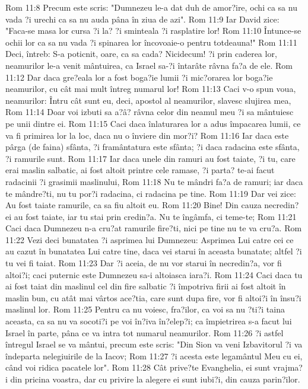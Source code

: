 Rom 11:8  Precum este scris: "Dumnezeu le-a dat duh de amor?ire, ochi ca sa nu vada ?i urechi ca sa nu auda pâna în ziua de azi".
Rom 11:9  Iar David zice: "Faca-se masa lor cursa ?i la? ?i sminteala ?i rasplatire lor!
Rom 11:10  Întunce-se ochii lor ca sa nu vada ?i spinarea lor încovoaie-o pentru totdeauna!"
Rom 11:11  Deci, întreb: S-a poticnit, oare, ca sa cada? Nicidecum! ?i prin caderea lor, neamurilor le-a venit mântuirea, ca Israel sa-?i întarâte râvna fa?a de ele.
Rom 11:12  Dar daca gre?eala lor a fost boga?ie lumii ?i mic?orarea lor boga?ie neamurilor, cu cât mai mult întreg numarul lor!
Rom 11:13  Caci v-o spun voua, neamurilor: Întru cât sunt eu, deci, apostol al neamurilor, slavesc slujirea mea,
Rom 11:14  Doar voi izbuti sa a?â? râvna celor din neamul meu ?i sa mântuiesc pe unii dintre ei.
Rom 11:15  Caci daca înlaturarea lor a adus împacarea lumii, ce va fi primirea lor la loc, daca nu o înviere din mor?i?
Rom 11:16  Iar daca este pârga (de faina) sfânta, ?i framântatura este sfânta; ?i daca radacina este sfânta, ?i ramurile sunt.
Rom 11:17  Iar daca unele din ramuri au fost taiate, ?i tu, care erai maslin salbatic, ai fost altoit printre cele ramase, ?i parta? te-ai facut radacinii ?i grasimii maslinului,
Rom 11:18  Nu te mândri fa?a de ramuri; iar daca te mândre?ti, nu tu por?i radacina, ci radacina pe tine.
Rom 11:19  Dar vei zice: Au fost taiate ramurile, ca sa fiu altoit eu.
Rom 11:20  Bine! Din cauza necredin?ei au fost taiate, iar tu stai prin credin?a. Nu te îngâmfa, ci teme-te;
Rom 11:21  Caci daca Dumnezeu n-a cru?at ramurile fire?ti, nici pe tine nu te va cru?a.
Rom 11:22  Vezi deci bunatatea ?i asprimea lui Dumnezeu: Asprimea Lui catre cei ce au cazut în bunatatea Lui catre tine, daca vei starui în aceasta bunatate; altfel ?i tu vei fi taiat.
Rom 11:23  Dar ?i aceia, de nu vor starui în necredin?a, vor fi altoi?i; caci puternic este Dumnezeu sa-i altoiasca iara?i.
Rom 11:24  Caci daca tu ai fost taiat din maslinul cel din fire salbatic ?i împotriva firii ai fost altoit în maslin bun, cu atât mai vârtos ace?tia, care sunt dupa fire, vor fi altoi?i în însu?i maslinul lor.
Rom 11:25  Pentru ca nu voiesc, fra?ilor, ca voi sa nu ?ti?i taina aceasta, ca sa nu va socoti?i pe voi în?iva în?elep?i; ca împietrirea s-a facut lui Israel în parte, pâna ce va intra tot numarul neamurilor.
Rom 11:26  ?i astfel întregul Israel se va mântui, precum este scris: "Din Sion va veni Izbavitorul ?i va îndeparta nelegiuirile de la Iacov;
Rom 11:27  ?i acesta este legamântul Meu cu ei, când voi ridica pacatele lor".
Rom 11:28  Cât prive?te Evanghelia, ei sunt vrajma?i din pricina voastra, dar cu privire la alegere ei sunt iubi?i, din cauza parin?ilor.

